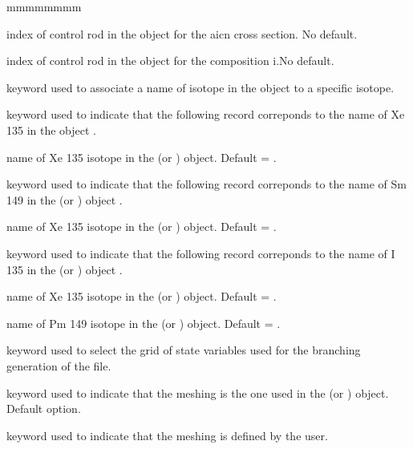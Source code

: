 \begin{ListeDeDescription}{mmmmmmmm}
\item[\dusa{aicn}] index of control rod in the  object for the aicn cross section. No default.

\item[\dusa{compo}] index of control rod in the  object for the composition i.No default. 

\item[\moc{ISOTOPES}]  keyword used to associate a name of isotope in the  object to a specific isotope.

\item[\moc{XE135}]  keyword used to indicate that the following record correponds to the name of Xe 135 in the  object .

\item[\dusa{xenam}]  name of Xe 135 isotope in the  (or )   object. Default  = 
.

\item[\moc{SM149}]  keyword used to indicate that the following record correponds to the name of Sm 149 in the  (or )   object .

\item[\dusa{smnam}]  name of Xe 135 isotope in the  (or )   object. Default  = 
.

\item[\moc{I135}]  keyword used to indicate that the following record correponds to the name of I 135 in the  (or )   object .

\item[\dusa{inam}]  name of Xe 135 isotope in the  (or )   object. Default  = 
.

\item[\dusa{pmnam}]  name of Pm 149 isotope in the  (or )   object. Default  = 
.

\item[\moc{GRID}] keyword used to select the grid of state variables used for the branching generation of the  file.

\item[\moc{SAP}] keyword used to indicate that the meshing is the one used in the  (or )   object. Default option.

\item[\moc{USER}] keyword used to indicate that the meshing is defined by the user.


\end{ListeDeDescription}
